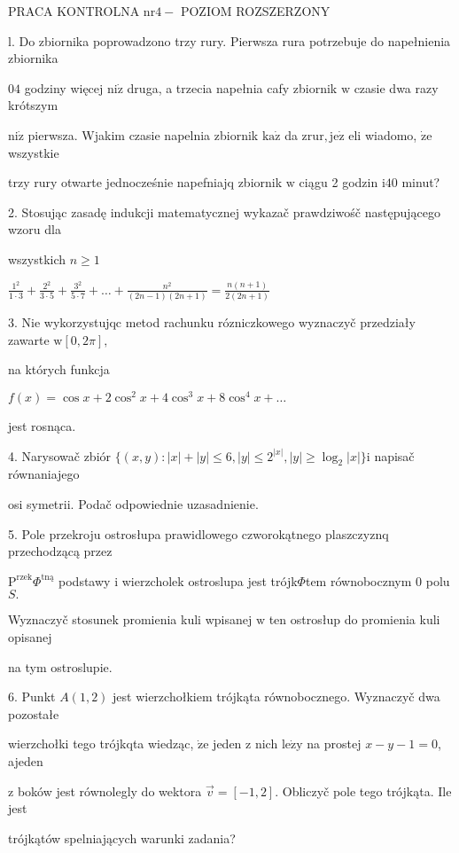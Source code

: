 \documentclass[a4paper,12pt]{article}
\begin{document}
PRACA KONTROLNA $\mathrm{n}\mathrm{r}4-$ POZIOM ROZSZERZONY

l. Do zbiornika poprowadzono trzy rury. Pierwsza rura potrzebuje do napełnienia zbiornika

$04$ godziny więcej $\mathrm{n}\mathrm{i}\dot{\mathrm{z}}$ druga, a trzecia napełnia cafy zbiornik $\mathrm{w}$ czasie dwa razy krótszym

$\mathrm{n}\mathrm{i}\dot{\mathrm{z}}$ pierwsza. Wjakim czasie napelnia zbiornik $\mathrm{k}\mathrm{a}\dot{\mathrm{z}}$ da $\mathrm{z}\mathrm{r}\mathrm{u}\mathrm{r}, \mathrm{j}\mathrm{e}\dot{\mathrm{z}}$ eli wiadomo, $\dot{\mathrm{z}}\mathrm{e}$ wszystkie

trzy rury otwarte jednocześnie napefniajq zbiornik $\mathrm{w}$ ciągu 2 godzin $\mathrm{i}40$ minut?

2. Stosując zasadę indukcji matematycznej wykazač prawdziwośč następującego wzoru dla

wszystkich $n\geq 1$

$\displaystyle \frac{1^{2}}{1\cdot 3}+\frac{2^{2}}{3\cdot 5}+\frac{3^{2}}{5\cdot 7}+\ldots+\frac{n^{2}}{(2n-1)(2n+1)}=\frac{n(n+1)}{2(2n+1)}$

3. Nie wykorzystujqc metod rachunku rózniczkowego wyznaczyč przedziały zawarte $\mathrm{w}[0,2\pi],$

na których funkcja

$ f(x)=\cos x+2\cos^{2}x+4\cos^{3}x+8\cos^{4}x+\ldots$

jest rosnąca.

4. Narysowač zbiór $\{(x,y):|x|+|y|\leq 6,|y|\leq 2^{|x|},|y|\geq\log_{2}|x|\}\mathrm{i}$ napisač równaniajego

osi symetrii. Podač odpowiednie uzasadnienie.

5. Pole przekroju ostrosłupa prawidlowego czworokątnego plaszczyznq przechodzącą przez

$\mathrm{P}^{\mathrm{r}\mathrm{z}\mathrm{e}\mathrm{k}}\Phi^{\mathrm{t}\mathrm{n}\text{ą}}$ podstawy $\mathrm{i}$ wierzcholek ostroslupa jest trójk$\Phi$tem równobocznym $0$ polu $S.$

Wyznaczyč stosunek promienia kuli wpisanej $\mathrm{w}$ ten ostrosłup do promienia kuli opisanej

na tym ostroslupie.

6. Punkt $A(1,2)$ jest wierzchołkiem trójkąta równobocznego. Wyznaczyč dwa pozostałe

wierzchołki tego trójkqta wiedząc, $\dot{\mathrm{z}}\mathrm{e}$ jeden $\mathrm{z}$ nich $\mathrm{l}\mathrm{e}\dot{\mathrm{z}}\mathrm{y}$ na prostej $x-y-1=0$, ajeden

$\mathrm{z}$ boków jest równolegly do wektora $\vec{v}= [-1,2]$. Obliczyč pole tego trójkąta. Ile jest

trójkątów spelniających warunki zadania?
\end{document}
